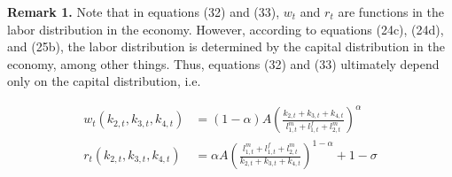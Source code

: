 \documentclass[BufferStockTheory]{subfiles}
\begin{document}
\textbf{Remark 1.} Note that in equations (32) and (33), $w_t$ and $r_t$ are functions in the labor distribution in the economy. However, according to equations (24c), (24d), and (25b), the labor distribution is determined by the capital distribution in the economy, among other things. Thus, equations (32) and (33) ultimately depend only on the capital distribution, i.e.

\begin{align}
	w_t(k_{2,t},k_{3,t},k_{4,t})
	&=(1-\alpha)A\left(\frac{k_{2,t}+k_{3,t}+k_{4,t}}{l_{1,t}^m+l_{1,t}^f+l_{2,t}^m}\right)^\alpha \label{eq:wageeq}\\
	r_t(k_{2,t},k_{3,t},k_{4,t})
	&=\alpha A\left(\frac{l_{1,t}^m+l_{1,t}^f+l_{2,t}^m}{k_{2,t}+k_{3,t}+k_{4,t}}\right)^{1-\alpha} +1 -\sigma \label{eq:rentaleq}
\end{align}
\end{document}
